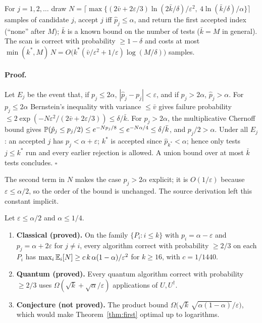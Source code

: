 \begin{proposition}\label{prop:scan}
For $j=1,2,\dots$ draw
$N=\big\lceil\max\{(2\bar v+2\varepsilon/3)\ln(2\bar k/\delta)/\varepsilon^2,\ 4\ln(\bar k/\delta)/\alpha\}\big\rceil$
samples of candidate $j$, accept $j$ iff $\hat p_j\le\alpha$, and return the first accepted index (``none'' after $M$); $\bar k$ is a known bound on the number of tests ($\bar k=M$ in general). The scan is correct with probability $\ge1-\delta$ and costs at most $\min(k^*,M)\,N=O\big(k^*(\bar v/\varepsilon^2+1/\varepsilon)\log(M/\delta)\big)$ samples.
\end{proposition}
\paragraph{Proof.} Let $E_j$ be the event that, if $p_j\le2\alpha$, $|\hat p_j-p_j|<\varepsilon$, and if $p_j>2\alpha$, $\hat p_j>\alpha$. For $p_j\le2\alpha$ Bernstein's inequality with variance $\le\bar v$ gives failure probability $\le2\exp(-N\varepsilon^2/(2\bar v+2\varepsilon/3))\le\delta/\bar k$. For $p_j>2\alpha$, the multiplicative Chernoff bound gives $\P(\hat p_j\le p_j/2)\le e^{-Np_j/8}\le e^{-N\alpha/4}\le\delta/\bar k$, and $p_j/2>\alpha$. Under all $E_j$: an accepted $j$ has $p_j<\alpha+\varepsilon$; $k^*$ is accepted since $\hat p_{k^*}<\alpha$; hence only tests $j\le k^*$ run and every earlier rejection is allowed. A union bound over at most $\bar k$ tests concludes. \hfill$\square$

\begin{remark}
The second term in $N$ makes the case $p_j>2\alpha$ explicit; it is $O(1/\varepsilon)$ because $\varepsilon\le\alpha/2$, so the order of the bound is unchanged. The source derivation left this constant implicit.
\end{remark}

\begin{proposition}\label{prop:lower}
Let $\varepsilon\le\alpha/2$ and $\alpha\le1/4$.
\begin{enumerate}
\item[(a)] \textbf{Classical (proved).} On the family $\{P_i:i\le k\}$ with $p_i=\alpha-\varepsilon$ and $p_j=\alpha+2\varepsilon$ for $j\ne i$, every algorithm correct with probability $\ge2/3$ on each $P_i$ has $\max_i\E_i[N]\ge c\,k\,\alpha(1-\alpha)/\varepsilon^2$ for $k\ge16$, with $c=1/1440$.
\item[(b)] \textbf{Quantum (proved).} Every quantum algorithm correct with probability $\ge2/3$ uses $\Omega(\sqrt k+\sqrt\alpha/\varepsilon)$ applications of $U,U^\dagger$.
\item[(c)] \textbf{Conjecture (not proved).} The product bound $\Omega\big(\sqrt k\,\sqrt{\alpha(1-\alpha)}/\varepsilon\big)$, which would make Theorem~\ref{thm:first} optimal up to logarithms.
\end{enumerate}
\end{proposition}
